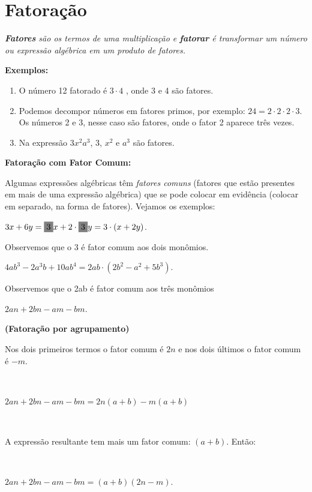 \section{Fatoração}

\begin{caixa}

    \textit{\textbf{Fatores} são os termos de uma multiplicação e \textbf{fatorar} é transformar um número ou expressão algébrica em um produto de fatores.}
    
\end{caixa}

\textbf{Exemplos:}
\begin{enumerate}[label=\alph*)]
\item O número 12 fatorado é $3 \cdot 4$ , onde 3 e 4 são fatores.

\item Podemos decompor números em fatores primos, por exemplo: $24 = 2 \cdot2 \cdot 2 \cdot 3$. Os números 2 e 3, nesse caso são fatores, onde o fator 2 aparece três vezes.

\item Na expressão $3x^2a^3$, 3, $x^2$  e $a^3$ são fatores.
\end{enumerate}

\textbf{Fatoração com Fator Comum:}

Algumas expressões algébricas têm \textit{fatores comuns} (fatores que estão presentes em mais de uma expressão algébrica) que se pode colocar em evidência (colocar em separado, na forma de fatores). Vejamos os exemplos:
\begin{enumerate}[label=\alph*)]
\begin{multicols}{2}
\item $3x + 6y = \colorbox{gray}{3}x + 2 \cdot \colorbox{gray}{3}y = 3 \cdot (x+2y)$.

Observemos que o 3 é fator comum aos dois monômios.
\end{multicols}

\begin{multicols}{2}
\item $4ab^3 - 2a^3b + 10ab^4 = 2ab \cdot (2b^2 - a^2 + 5b^3)$.

Observemos  que o 2ab é fator comum aos três monômios
\end{multicols}

\begin{multicols}{2}
\item $2an + 2bn - am - bm$.

\textbf{(Fatoração por agrupamento)}
\end{multicols}

Nos dois primeiros termos o fator comum é $2n$ e nos dois últimos o fator comum é $-m$.

~~

$2an + 2bn - am - bm = 2n(a+b) - m(a+b)$

~~

A expressão resultante tem mais um fator comum: $(a+b)$. Então:

~~

$2an + 2bn - am - bm = (a+b)(2n-m)$. 
\end{enumerate}

